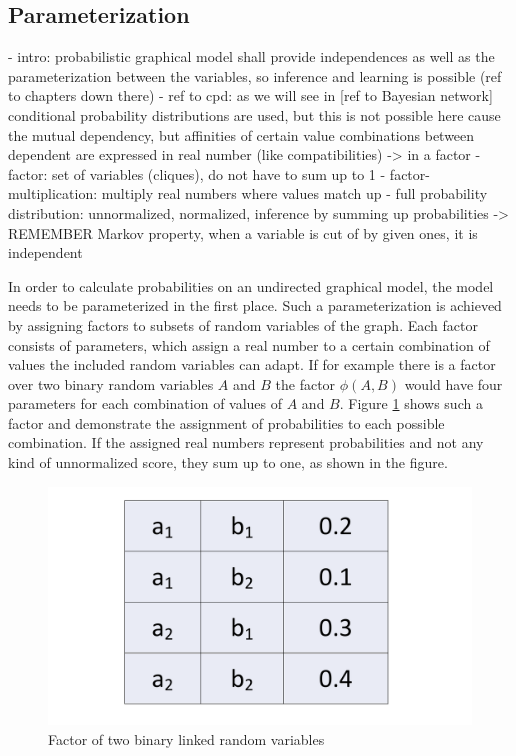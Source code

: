 \subsection{Parameterization}

- intro: probabilistic graphical model shall provide independences as well as the parameterization between the variables, so inference and learning is possible (ref to chapters down there)
- ref to cpd: as we will see in [ref to Bayesian network] conditional probability distributions are used, but this is not possible here cause the mutual dependency, but affinities of certain value combinations between dependent are expressed in real number (like compatibilities) -> in a factor
- factor: set of variables (cliques), do not have to sum up to 1
- factor-multiplication: multiply real numbers where values match up
- full probability distribution: unnormalized, normalized, inference by summing up probabilities -> REMEMBER Markov property, when a variable is cut of by given ones, it is independent

In order to calculate probabilities on an undirected graphical model, the model needs to be parameterized in the first place. Such a parameterization is achieved by assigning factors to subsets of random variables of the graph. Each factor consists of parameters, which assign a real number to a certain combination of values the included random variables can adapt. If for example there is a factor over two binary random variables $A$ and $B$ the factor $\phi(A,B)$ would have four parameters for each combination of values of $A$ and $B$. Figure \ref{fig:param} shows such a factor and demonstrate the assignment of probabilities to each possible combination. If the assigned real numbers represent probabilities and not any kind of unnormalized score, they sum up to one, as shown in the figure.

\begin{figure}[htpb]
  \centering
  	\includegraphics[scale=0.3]{img/param.pdf} 
  \caption{Factor of two binary linked random variables}
  \label{fig:param}
\end{figure}

